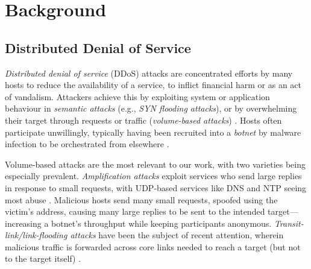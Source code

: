 \documentclass[10pt, times, conference, letterpaper]{IEEEtran}
\begin{document}
\section{Background}

\subsection{Distributed Denial of Service}


\emph{Distributed denial of service} (DDoS) attacks are concentrated efforts by many hosts to reduce the availability of a service, to inflict financial harm or as an act of vandalism.
Attackers achieve this by exploiting system or application behaviour in \emph{semantic attacks} (e.g., \emph{SYN flooding attacks}), or by overwhelming their target through requests or traffic (\emph{volume-based attacks}) \cite{DBLP:conf/imc/JonkerKKRSD17}.
Hosts often participate unwillingly, typically having been recruited into a \emph{botnet} by malware infection to be orchestrated from elsewhere \cite{DBLP:conf/uss/AntonakakisABBB17}.

Volume-based attacks are the most relevant to our work, with two varieties being especially prevalent.
\emph{Amplification attacks} exploit services who send large replies in response to small requests, with UDP-based services like DNS and NTP seeing most abuse \cite{DBLP:conf/ndss/Rossow14, DBLP:conf/uss/KuhrerHRH14}.
Malicious hosts send many small requests, spoofed using the victim's address, causing many large replies to be sent to the intended target---increasing a botnet's throughput while keeping participants anonymous.
\emph{Transit-link/link-flooding attacks} have been the subject of recent attention, wherein malicious traffic is forwarded across core links needed to reach a target (but not to the target itself) \cite{DBLP:conf/sp/KangLG13, DBLP:conf/esorics/StuderP09}.
\end{document}
